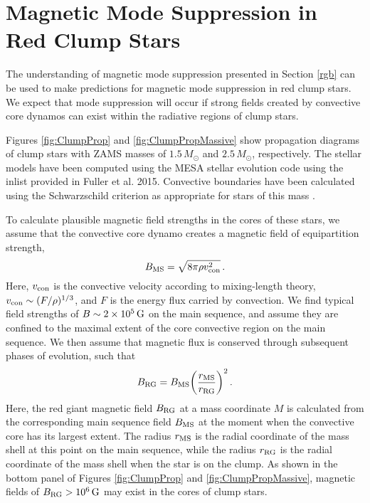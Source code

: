 \section{Magnetic Mode Suppression in Red Clump Stars}

The understanding of magnetic mode suppression presented in Section \ref{rgb} can be used to make predictions for magnetic mode suppression in red clump stars. We expect that mode suppression will occur if strong fields created by convective core dynamos can exist within the radiative regions of clump stars. 

Figures \ref{fig:ClumpProp} and \ref{fig:ClumpPropMassive} show propagation diagrams of clump stars with ZAMS masses of $1.5 \, M_\odot$ and $2.5 \, M_\odot$, respectively. The stellar models have been computed using the MESA stellar evolution code \citep{Paxton_2010,Paxton_2013} using the inlist provided in Fuller et al. 2015. Convective boundaries have been calculated using the Schwarzschild criterion as appropriate for stars of this mass \citep{Moore_2015}.

To calculate plausible magnetic field strengths in the cores of these stars, we assume that the convective core dynamo creates a magnetic field of equipartition strength,
\begin{equation}
\label{eqn:Beq}
B_{\rm MS} = \sqrt{ 8 \pi \rho v_{\rm con}^2} \, .
\end{equation}
Here, $v_{\rm con}$ is the convective velocity according to mixing-length theory, $v_{\rm con} \sim (F/\rho)^{1/3}$, and $F$ is the energy flux carried by convection. We find typical field strengths of $B \sim 2 \times 10^5 \, {\rm G}$ on the main sequence, and assume they are confined to the maximal extent of the core convective region on the main sequence. We then assume that magnetic flux is conserved through subsequent phases of evolution, such that
\begin{equation}
\label{eqn:Brgb}
B_{\rm RG} = B_{\rm MS} \bigg( \frac{r_{\rm MS}}{r_{\rm RG}} \bigg)^2 \, .
\end{equation}
Here, the red giant magnetic field $B_{\rm RG}$ at a mass coordinate $M$ is calculated from the corresponding main sequence field $B_{\rm MS}$ at the moment when the convective core has its largest extent. The radius $r_{\rm MS}$ is the radial coordinate of the mass shell at this point on the main sequence, while the radius $r_{\rm RG}$ is the radial coordinate of the mass shell when the star is on the clump. As shown in the bottom panel of Figures \ref{fig:ClumpProp} and \ref{fig:ClumpPropMassive}, magnetic fields of $B_{\rm RG} > 10^6 \, {\rm G}$ may exist in the cores of clump stars. 

